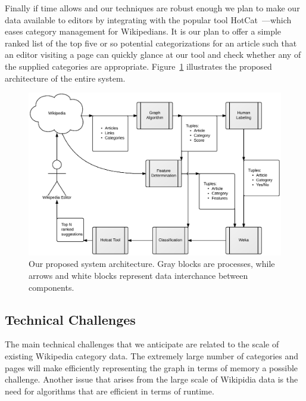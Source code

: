 \documentclass{sig-alternate}
\begin{document}
Finally if time allows and our techniques are robust enough we plan to make our data available to editors by integrating with the popular tool HotCat~\cite{HotCat}---which eases category management for Wikipedians. It is our plan to offer a simple ranked list of the top five or so potential categorizations for an article such that an editor visiting a page can quickly glance at our tool and check whether any of the supplied categories are appropriate. Figure~\ref{fig:block_diagram} illustrates the proposed architecture of the entire system.
\begin{figure}[htb!]
	\begin{center}
		\includegraphics[width=1.0\linewidth]{block_diagram}
	\end{center}
	\vspace{-12pt}
	\caption{Our proposed system architecture. Gray blocks are processes, while arrows and white blocks represent data interchance between components.}
	\label{fig:block_diagram}
\end{figure}

\subsection{Technical Challenges}
\label{subsec:tech_challenges}
The main technical challenges that we anticipate are related to the scale of existing Wikipedia category data. The extremely large number of categories and pages will make efficiently representing the graph in terms of memory a possible challenge. Another issue that arises from the large scale of Wikipidia data is the need for algorithms that are efficient in terms of runtime. 
\end{document}
